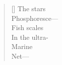 \label{ch:above_the_airstrip}
\settowidth{\versewidth}{                                   Marine}
\begin{verse}[\versewidth]
The stars\\
                    Phosphoresce---\\
Fish scales\\
                    In the ultra-\\
                                   Marine\\
Net---
\end{verse}
